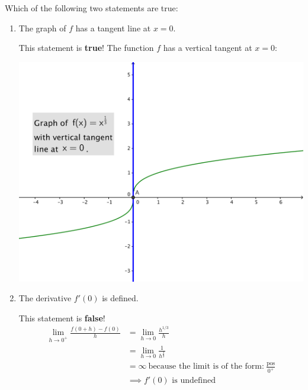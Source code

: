 \documentclass[nooutcomes, handout]{ximera}
\begin{document}
\begin{problem}
  Which of the following two statements are true:
  \begin{enumerate}
     \item The graph of $f$ has a tangent line at $x = 0$.
      \begin{freeResponse}
        This statement is \textbf{true}!
        The function $f$ has a vertical tangent at $x = 0$:
        \begin{image}
          \includegraphics[scale = 0.5]{figure4.png}
        \end{image}
      \end{freeResponse}

    \item  The derivative $f'(0)$ is defined.
      \begin{freeResponse}
        This statement is \textbf{false}!
        \begin{align*}
          \lim_{h \to 0^+} \frac{f(0  + h) - f(0)}{h}
          &= \lim_{h \to 0} \frac{h^{1/3}}{h} \\
          &= \lim_{h \to 0} \frac{1}{h^{\frac{2}{3}}} \\	
          &= \infty\ \text{because the limit is of the form:}\ \frac{\text{pos}}{0^+}\\
          &\implies \mbox{$f'(0)$ is undefined}
        \end{align*}
      \end{freeResponse}
  \end{enumerate}
\end{problem}	
	
			
		
\end{document}
